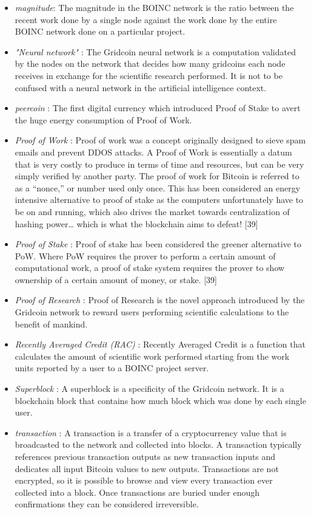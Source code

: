 \begin{itemize}
  \item \textit{magnitude}: The magnitude in the BOINC network is the ratio between the recent work done by a single node against the work done by the entire BOINC network done on a particular project.
  \item \textit{"Neural network"} : The Gridcoin neural network is a computation validated by the nodes on the network that decides how many gridcoins each node receives in exchange for the scientific research performed. It is not to be confused with a neural network in the artificial intelligence context.
  \item \textit{peercoin} : The first digital currency which introduced Proof of Stake to avert the huge energy consumption of Proof of Work.
  \item \textit{Proof of Work} : Proof of work was a concept originally designed to sieve spam emails and prevent DDOS attacks. A Proof of Work is essentially a datum that is very costly to produce in terms of time and resources, but can be very simply verified by another party. The proof of work for Bitcoin is referred to as a “nonce,” or number used only once. This has been considered an energy intensive alternative to proof of stake as the computers unfortunately have to be on and running, which also drives the market towards centralization of hashing power… which is what the blockchain aims to defeat! [39]
  \item \textit{Proof of Stake} : Proof of stake has been considered the greener alternative to PoW. Where PoW requires the prover to perform a certain amount of computational work, a proof of stake system requires the prover to show ownership of a certain amount of money, or stake. [39]
  \item \textit{Proof of Research} : Proof of Research is the novel approach introduced by the Gridcoin network to reward users performing scientific calculations to the benefit of mankind.
  \item \textit{Recently Averaged Credit (RAC)} : Recently Averaged Credit is a function that calculates the amount of scientific work performed starting from the work units reported by a user to a BOINC project server.
  \item \textit{Superblock} : A superblock is a specificity of the Gridcoin network. It is a blockchain block that contains how much block which was done by each single user.
  \item \textit{transaction} : A transaction is a transfer of a cryptocurrency value that is broadcasted to the network and collected into blocks. A transaction typically references previous transaction outputs as new transaction inputs and dedicates all input Bitcoin values to new outputs. Transactions are not encrypted, so it is possible to browse and view every transaction ever collected into a block. Once transactions are buried under enough confirmations they can be considered irreversible.\\

\end{itemize}
